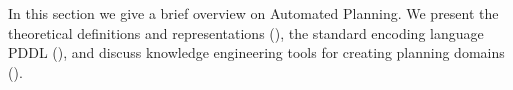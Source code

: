 In this section we give a brief overview on Automated Planning.
We present the theoretical definitions and representations (), the standard encoding language PDDL (), and discuss knowledge engineering tools for creating planning domains ().


%
%